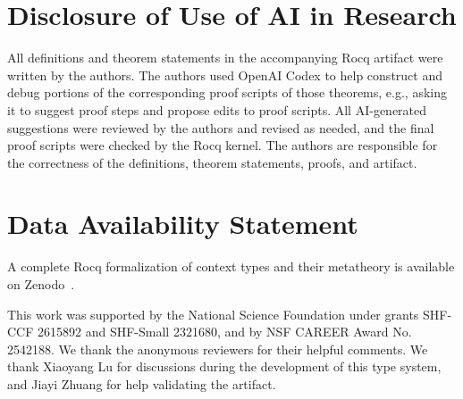 \documentclass[acmsmall,screen,review]{acmart}
\begin{document}
\section*{Disclosure of Use of AI in Research}
All definitions and theorem statements in the accompanying Rocq
artifact were written by the authors. The authors used OpenAI Codex to
help construct and debug portions of the corresponding proof scripts
of those theorems, e.g., asking it to suggest proof steps and propose
edits to proof scripts. All AI-generated suggestions were reviewed by
the authors and revised as needed, and the final proof scripts were
checked by the Rocq kernel. The authors are responsible for the
correctness of the definitions, theorem statements, proofs, and
artifact.

\section*{Data Availability Statement}
A complete Rocq formalization of context types and their metatheory
is available on Zenodo~\cite{zhe_zhou_2026_23293018}.

\begin{acks}
This work was supported by the National Science Foundation under
grants SHF-CCF 2615892 and SHF-Small 2321680, and by NSF CAREER Award
No. 2542188. We thank the anonymous reviewers for their helpful
comments. We thank Xiaoyang Lu for discussions during the development
of this type system, and Jiayi Zhuang for help validating the artifact.
\end{acks}




\ifdefined\fullversion
\newpage
\appendix




\fi




% 
% 
% 
% 
% 
\end{document}
